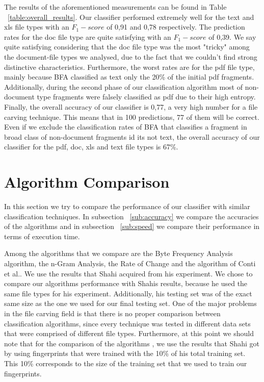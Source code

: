 The results of the aforementioned measurements can be found in Table ~\ref{table:overall_results}. Our classifier performed extremely well for the text and xls file types with an ${F_1}-score$ of 0,91 and 0,78 respectively. The prediction rates  for the doc file type are quite satisfying with an ${F_1}-score$  of 0,39. We say quite satisfying considering that the doc file type was the most "tricky" among the document-file types we analysed, due to the fact that we couldn't find strong distinctive characteristics. Furthermore, the worst rates are for the pdf file type, mainly because BFA classified as text only the 20\% of the initial pdf fragments. Additionally, during the second phase of our classification algorithm most of non-document type fragments were falsely classified as pdf due to their high entropy. Finally, the overall accuracy of our classifier is 0,77, a very high number for a file carving technique. This means that in 100 predictions, 77 of them will be correct. Even if we exclude the classification rates of BFA that classifies a fragment in broad class of non-document fragments id its not text, the overall accuracy of our classifier for the pdf, doc, xls and text file types is 67\%.


\section{Algorithm Comparison}\label{sec:comparison}
In this section we try to compare the performance of our classifier with similar classification techniques. In subsection ~\ref{sub:accuracy} we compare the accuracies of the algorithms and in subsection ~\ref{sub:speed} we compare their performance in terms of execution time.

Among the algorithms that we compare are the Byte Frequency Analysis algorithm\cite{MacDaniel}, the n-Gram Analysis\cite{ngram}, the Rate of Change\cite{roc} and the algorithm of Conti et al.\cite{Conti}. We use the results that Shahi acquired from his experiment\cite{Ashim}. We chose to compare our algorithms performance with Shahis results, because he used the same file types for his experiment. Additionally, his testing set was of the exact same size as the one we used for our final testing set. One of the major problems in the file carving field is that there is no proper comparison between classification algorithms, since every technique was tested in different data sets that were comprised of different file types. Furthermore, at this point we should note that for the comparison of the algorithms , we use the results that Shahi got by using fingerprints that were trained with the 10\% of his total training set. This 10\% corresponds to the size of the training set that we used to train our fingerprints.


